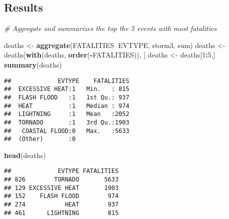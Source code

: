 \documentclass[]{article}
\newenvironment{Shaded}{\begin{snugshade}}{\end{snugshade}}
\newcommand{\KeywordTok}[1]{\textcolor[rgb]{0.13,0.29,0.53}{\textbf{#1}}}
\newcommand{\DataTypeTok}[1]{\textcolor[rgb]{0.13,0.29,0.53}{#1}}
\newcommand{\DecValTok}[1]{\textcolor[rgb]{0.00,0.00,0.81}{#1}}
\newcommand{\StringTok}[1]{\textcolor[rgb]{0.31,0.60,0.02}{#1}}
\newcommand{\CommentTok}[1]{\textcolor[rgb]{0.56,0.35,0.01}{\textit{#1}}}
\newcommand{\OperatorTok}[1]{\textcolor[rgb]{0.81,0.36,0.00}{\textbf{#1}}}
\newcommand{\NormalTok}[1]{#1}
\begin{document}
\subsection{Results}\label{results}

\begin{Shaded}
\begin{Highlighting}[]
\CommentTok{# Aggregate and summarizes the top the 5 events with most fatalities}

\NormalTok{  deaths <-}\StringTok{ }\KeywordTok{aggregate}\NormalTok{(FATALITIES}\OperatorTok{~}\NormalTok{EVTYPE, storm3, sum)}
\NormalTok{  deaths <-}\StringTok{ }\NormalTok{deaths[}\KeywordTok{with}\NormalTok{(deaths, }\KeywordTok{order}\NormalTok{(}\OperatorTok{-}\NormalTok{FATALITIES)), ]}
\NormalTok{  deaths <-}\StringTok{ }\NormalTok{deaths[}\DecValTok{1}\OperatorTok{:}\DecValTok{5}\NormalTok{,]}
  \KeywordTok{summary}\NormalTok{(deaths)}
\end{Highlighting}
\end{Shaded}

\begin{verbatim}
##             EVTYPE    FATALITIES  
##  EXCESSIVE HEAT:1   Min.   : 815  
##  FLASH FLOOD   :1   1st Qu.: 937  
##  HEAT          :1   Median : 974  
##  LIGHTNING     :1   Mean   :2052  
##  TORNADO       :1   3rd Qu.:1903  
##   COASTAL FLOOD:0   Max.   :5633  
##  (Other)       :0
\end{verbatim}

\begin{Shaded}
\begin{Highlighting}[]
  \KeywordTok{head}\NormalTok{(deaths)}
\end{Highlighting}
\end{Shaded}

\begin{verbatim}
##             EVTYPE FATALITIES
## 826        TORNADO       5633
## 129 EXCESSIVE HEAT       1903
## 152    FLASH FLOOD        974
## 274           HEAT        937
## 461      LIGHTNING        815
\end{verbatim}

\begin{Shaded}
\end{Shaded}
\end{document}
